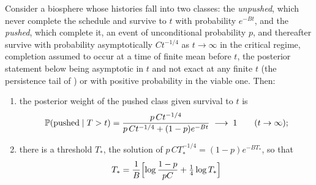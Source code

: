 \begin{remark}
\begin{proposition}\label{sch:prop:threshold}
Consider a biosphere whose histories fall into two classes: the
\emph{unpushed}, which never complete the schedule and survive to $t$
with probability $e^{-Bt}$, and the \emph{pushed}, which
complete it, an event of unconditional probability $p$, and thereafter survive with probability asymptotically $C t^{-1/4}$ as $t \to \infty$ in the critical regime, completion assumed to occur at a time of finite mean before $t$, the posterior statement below being asymptotic in $t$ and not exact at any finite $t$
(the persistence tail of \cite{GoldenSurvivorship}) or with positive probability in the viable
one. Then:
\begin{enumerate}[label=\emph{(\roman*)},itemsep=2pt]
\item the posterior weight of the pushed class given survival to $t$ is
\begin{equation}\label{sch:eq:pushposterior}
\mathbb{P}(\text{pushed}\mid T>t)=\frac{p\,Ct^{-1/4}}{p\,Ct^{-1/4}+(1-p)e^{-Bt}}
\;\longrightarrow\;1\qquad(t\to\infty);
\end{equation}
\item there is a threshold $T_\ast$, the solution of
$p\,CT_\ast^{-1/4}=(1-p)e^{-BT_\ast}$, so that
\begin{equation}\label{sch:eq:threshold}
T_\ast=\frac{1}{B}\Bigl[\log\frac{1-p}{pC}+\tfrac14\log T_\ast\Bigr]

\end{equation}
\end{enumerate}
\end{proposition}
\end{remark}
